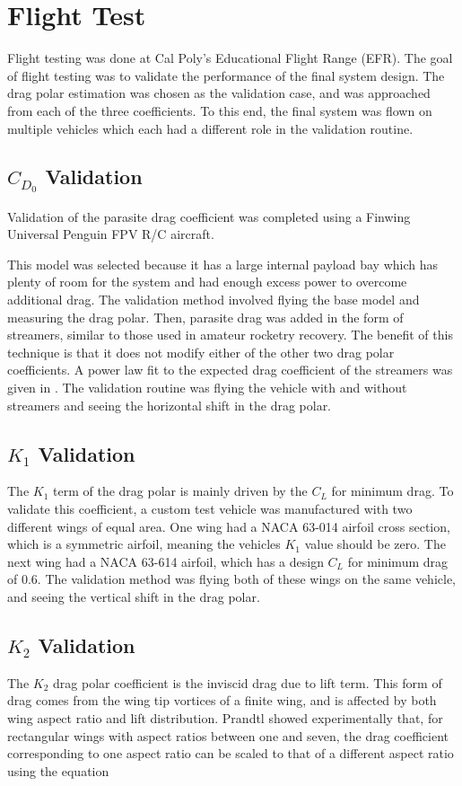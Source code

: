 \chapter{Flight Test}
\label{flight-test}
Flight testing was done at Cal Poly's Educational Flight Range (EFR). The goal of flight testing was to validate the performance of the final system design. The drag polar estimation was chosen as the validation case, and was approached from each of the three coefficients. To this end, the final system was flown on multiple vehicles which each had a different role in the validation routine.

\section{$C_{D_0}$ Validation}
Validation of the parasite drag coefficient was completed using a Finwing Universal Penguin FPV R/C aircraft\cite{penguinRC}. 

This model was selected because it has a large internal payload bay which has plenty of room for the system and had enough excess power to overcome additional drag. The validation method involved flying the base model and measuring the drag polar. Then, parasite drag was added in the form of streamers, similar to those used in amateur rocketry recovery. The benefit of this technique is that it does not modify either of the other two drag polar coefficients. A power law fit to the expected drag coefficient of the streamers was given in \cite{Auman2001}. The validation routine was flying the vehicle with and without streamers and seeing the horizontal shift in the drag polar.

\section{$K_1$ Validation}
The $K_1$ term of the drag polar is mainly driven by the $C_L$ for minimum drag. To validate this coefficient, a custom test vehicle was manufactured with two different wings of equal area. One wing had a NACA 63-014 airfoil cross section, which is a symmetric airfoil, meaning the vehicles $K_1$ value should be zero. The next wing had a NACA 63-614 airfoil, which has a design $C_L$ for minimum drag of 0.6. The validation method was flying both of these wings on the same vehicle, and seeing the vertical shift in the drag polar.
\section{$K_2$ Validation}
The $K_2$ drag polar coefficient is the inviscid drag due to lift term. This form of drag comes from the wing tip vortices of a finite wing, and is affected by both wing aspect ratio and lift distribution. Prandtl showed experimentally\cite{prandtl1923applications} that, for rectangular wings with aspect ratios between one and seven, the drag coefficient corresponding to one aspect ratio can be scaled to that of a different aspect ratio using the equation

